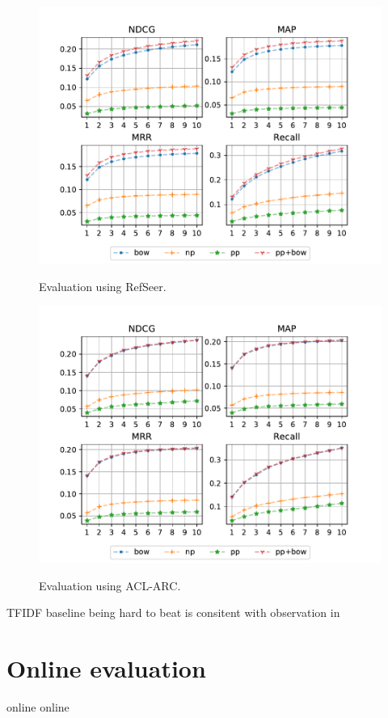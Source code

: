 \begin{figure}
  \centering
    \includegraphics[width=.9\textwidth]{figures/evaluation/RefSeer.pdf}
  \label{fig:evalrefseer}
  \caption{Evaluation using RefSeer.}

  \centering
    \includegraphics[width=.9\textwidth]{figures/evaluation/ACL.pdf}
  \label{fig:evalacl}
  \caption{Evaluation using ACL-ARC.}
\end{figure}

TFIDF baseline being hard to beat is consitent with observation in \cite{Beel2017}

\section{Online evaluation}\label{sec:oneval}
online online
